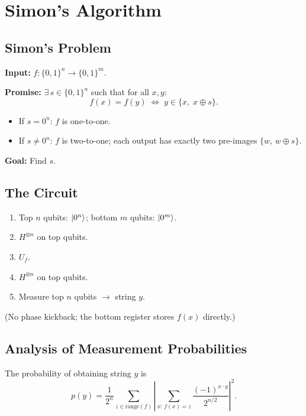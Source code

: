 \documentclass[11pt]{article}
\theoremstyle{definition}
\begin{document}
\section{Simon's Algorithm}

\subsection{Simon's Problem}

\textbf{Input:} $f:\{0,1\}^n\to\{0,1\}^m$.

\textbf{Promise:} $\exists\,s\in\{0,1\}^n$ such that for all $x,y$:
\[
    f(x)=f(y) \;\Longleftrightarrow\; y\in\{x,\;x\oplus s\}.
\]

\begin{itemize}
    \item If $s=0^n$: $f$ is one-to-one.
    \item If $s\neq 0^n$: $f$ is two-to-one; each output has exactly two pre-images $\{w,\,w\oplus s\}$.
\end{itemize}

\textbf{Goal:} Find $s$.

\subsection{The Circuit}

\begin{enumerate}
    \item Top $n$ qubits: $\ket{0^n}$; bottom $m$ qubits: $\ket{0^m}$.
    \item $H^{\otimes n}$ on top qubits.
    \item $U_f$.
    \item $H^{\otimes n}$ on top qubits.
    \item Measure top $n$ qubits $\to$ string $y$.
\end{enumerate}

(No phase kickback; the bottom register stores $f(x)$ directly.)

\subsection{Analysis of Measurement Probabilities}

The probability of obtaining string $y$ is
\[
    p(y) = \frac{1}{2^n}\sum_{z\in\mathrm{range}(f)}
    \left|\sum_{x:\,f(x)=z}\frac{(-1)^{x\cdot y}}{2^{n/2}}\right|^2.
\]
\end{document}
